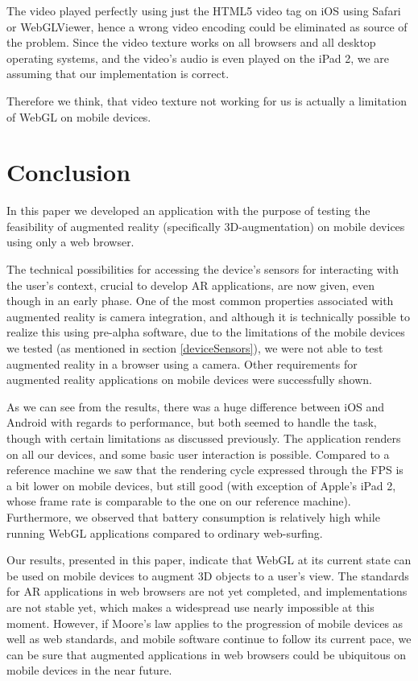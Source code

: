 \documentclass[12pt,journal,compsoc]{IEEEtran}
\begin{document}
The video played perfectly using just the HTML5 video tag on iOS using Safari or WebGLViewer, hence a wrong video encoding could be eliminated as source of the problem. Since the video texture works on all browsers and all desktop operating systems, and the video’s audio is even played on the iPad 2, we are assuming that our implementation is correct. 

Therefore we think, that video texture not working for us is actually a limitation of WebGL on mobile devices.


\section{Conclusion}
In this paper we developed an application with the purpose of testing the feasibility of augmented reality (specifically 3D-augmentation) on mobile devices using only a web browser. 

The technical possibilities for accessing the device’s sensors for interacting with the user’s context, crucial to develop AR applications, are now given, even though in an early phase. One of the most common properties associated with augmented reality is camera integration, and although it is technically possible to realize this using pre-alpha software, due to the limitations of the mobile devices we tested (as mentioned in section \ref{deviceSensors}), we were not able to test augmented reality in a browser using a camera. Other requirements for augmented reality applications on mobile devices were successfully shown.

As we can see from the results, there was a huge difference between iOS and Android with regards to performance, but both seemed to handle the task, though with certain limitations as discussed previously. The application renders on all our devices, and some basic user interaction is possible. Compared to a reference machine we saw that the rendering cycle expressed through the FPS is a bit lower on mobile devices, but still good (with exception of Apple’s iPad 2, whose frame rate is comparable to the one on our reference machine). Furthermore, we observed that battery consumption is relatively high while running WebGL applications compared to ordinary web-surfing. 

Our results, presented in this paper, indicate that WebGL at its current state can be used on mobile devices to augment 3D objects to a user’s view. The standards for AR applications in web browsers are not yet completed, and implementations are not stable yet,  which makes a widespread use nearly impossible at this moment. However, if Moore’s law \cite{Schaller1997} applies to the progression of mobile devices as well as web standards, and mobile software continue to follow its current pace, we can be sure that augmented applications in web browsers could be ubiquitous on mobile devices in the near future.
\end{document}
